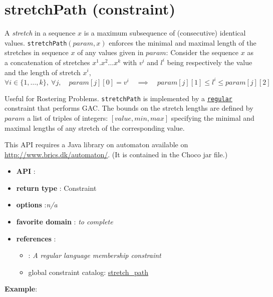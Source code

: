 \label{stretchpath}
\hypertarget{stretchpath}{}

\section{stretchPath (constraint)}\label{stretchpath:stretchpathconstraint}\hypertarget{stretchpath:stretchpathconstraint}{}


\begin{notedef}
  A \emph{stretch} in a sequence $x$ is a maximum subsequence of (consecutive) identical values.  
  \texttt{stretchPath}$(param,x)$ enforces the minimal and maximal length of the stretches in sequence $x$ of any values given in $param$:
Consider the sequence $x$ as a concatenation of stretches $x^1.x^2\ldots x^k$ with $v^i$ and $l^i$ being respectively the value and the length of stretch $x^i$,
$$\forall i\in\{1,\ldots,k\},\ \forall j,\quad param[j][0]=v^i\quad\implies\quad param[j][1]\le l^i\le param[j][2]$$
\end{notedef}


Useful for Rostering Problems. \texttt{stretchPath} is implemented by a \hyperlink{regular}{\texttt{regular}} constraint that performs GAC. The bounds on the stretch lengths are defined by $param$ a list of triples of integers: $[value, min, max]$ specifying the minimal and maximal lengths of any stretch of the corresponding value. 

This API requires a Java library on automaton available on \href{http://www.brics.dk/automaton/}{http://www.brics.dk/automaton/}. (It is contained in the Choco jar file.)

\begin{itemize}
	\item \textbf{API} : 
	\item \textbf{return type} : Constraint
	\item \textbf{options} :\emph{n/a}
	\item \textbf{favorite domain} : \emph{to complete}
	\item \textbf{references} :
      \begin{itemize}
      \item \cite{PesantCP04}: \emph{A regular language membership constraint}
      \item global constraint catalog: \href{http://www.emn.fr/x-info/sdemasse/gccat/Cstretch_path.html}{stretch\_path}
      \end{itemize}
\end{itemize}


\textbf{Example}:

